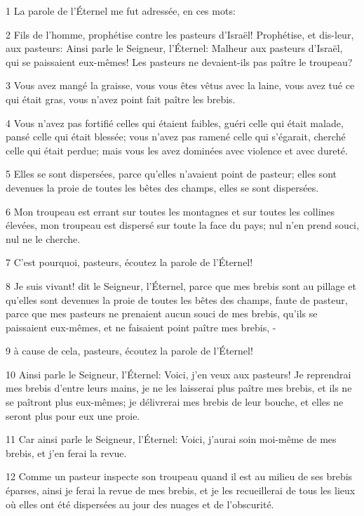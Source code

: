 \par 1 La parole de l'Éternel me fut adressée, en ces mots:
\par 2 Fils de l'homme, prophétise contre les pasteurs d'Israël! Prophétise, et dis-leur, aux pasteurs: Ainsi parle le Seigneur, l'Éternel: Malheur aux pasteurs d'Israël, qui se paissaient eux-mêmes! Les pasteurs ne devaient-ils pas paître le troupeau?
\par 3 Vous avez mangé la graisse, vous vous êtes vêtus avec la laine, vous avez tué ce qui était gras, vous n'avez point fait paître les brebis.
\par 4 Vous n'avez pas fortifié celles qui étaient faibles, guéri celle qui était malade, pansé celle qui était blessée; vous n'avez pas ramené celle qui s'égarait, cherché celle qui était perdue; mais vous les avez dominées avec violence et avec dureté.
\par 5 Elles se sont dispersées, parce qu'elles n'avaient point de pasteur; elles sont devenues la proie de toutes les bêtes des champs, elles se sont dispersées.
\par 6 Mon troupeau est errant sur toutes les montagnes et sur toutes les collines élevées, mon troupeau est dispersé sur toute la face du pays; nul n'en prend souci, nul ne le cherche.
\par 7 C'est pourquoi, pasteurs, écoutez la parole de l'Éternel!
\par 8 Je suis vivant! dit le Seigneur, l'Éternel, parce que mes brebis sont au pillage et qu'elles sont devenues la proie de toutes les bêtes des champs, faute de pasteur, parce que mes pasteurs ne prenaient aucun souci de mes brebis, qu'ils se paissaient eux-mêmes, et ne faisaient point paître mes brebis, -
\par 9 à cause de cela, pasteurs, écoutez la parole de l'Éternel!
\par 10 Ainsi parle le Seigneur, l'Éternel: Voici, j'en veux aux pasteurs! Je reprendrai mes brebis d'entre leurs mains, je ne les laisserai plus paître mes brebis, et ils ne se paîtront plus eux-mêmes; je délivrerai mes brebis de leur bouche, et elles ne seront plus pour eux une proie.
\par 11 Car ainsi parle le Seigneur, l'Éternel: Voici, j'aurai soin moi-même de mes brebis, et j'en ferai la revue.
\par 12 Comme un pasteur inspecte son troupeau quand il est au milieu de ses brebis éparses, ainsi je ferai la revue de mes brebis, et je les recueillerai de tous les lieux où elles ont été dispersées au jour des nuages et de l'obscurité.
